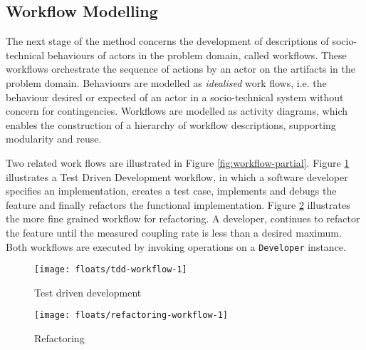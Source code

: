 \documentclass{sig-alternate}
\begin{document}

\subsection{Workflow Modelling}


The next stage of the method concerns the development of descriptions of
socio-technical behaviours of actors in the problem domain, called workflows.
These workflows orchestrate the sequence of actions by an actor on the artifacts
in the problem domain.  Behaviours are modelled as \emph{idealised} work flows,
i.e. the behaviour desired or expected of an actor in a socio-technical system
without concern for contingencies.  Workflows are modelled as activity diagrams,
which enables the construction of a hierarchy of workflow descriptions,
supporting modularity and reuse.  

Two related work flows are illustrated in Figure \ref{fig:workflow-partial}.
Figure \ref{fig:workflow-tdd} illustrates a Test Driven Development workflow, in
which a software developer specifies an implementation, creates a test case,
implements and debugs the feature and finally refactors the functional
implementation.  Figure \ref{fig:workflow-refactoring} illustrates the more fine
grained workflow for refactoring.  A developer, continues to refactor the
feature until the measured coupling rate is less than a desired maximum.  Both
workflows are executed by invoking operations on a \lstinline!Developer!
instance.

\begin{figure*}
  \centering

  \begin{subfigure}[b]{.45\linewidth}
    \centering
    \texttt{[image: floats/tdd-workflow-1]}

    \caption{Test driven development}
    \label{fig:workflow-tdd}
  \end{subfigure}
  \begin{subfigure}[b]{.45\linewidth}
    \centering
    \texttt{[image: floats/refactoring-workflow-1]}
    
    \caption{Refactoring}
    \label{fig:workflow-refactoring}
  \end{subfigure}
  
\

  \caption{Partial socio-technical workflows for software development expressed
    as UML activity diagrams.}

  \label{fig:workflow-partial}
\end{figure*}
\end{document}
